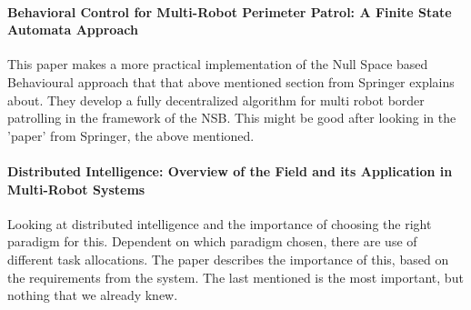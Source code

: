 \paragraph{Behavioral Control for Multi-Robot Perimeter Patrol: A Finite State Automata Approach}
This paper makes a more practical implementation of the Null Space based Behavioural approach that that above mentioned section from Springer explains about. They develop a fully decentralized algorithm for multi robot border patrolling in the framework of the NSB.
This might be good after looking in the 'paper' from Springer, the above mentioned.

\paragraph{Distributed Intelligence: Overview of the Field and its Application in Multi-Robot Systems}
Looking at distributed intelligence and the importance of choosing the right paradigm for this. Dependent on which paradigm chosen, there are use of different task allocations. The paper describes the importance of this, based on the requirements from the system.
The last mentioned is the most important, but nothing that we already knew.

